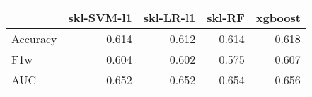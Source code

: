 \begin{tabular}{lrrrr}
\toprule
{} &  skl-SVM-l1 &  skl-LR-l1 &  skl-RF &  xgboost \\
\midrule
Accuracy &       0.614 &      0.612 &   0.614 &    0.618 \\
F1w      &       0.604 &      0.602 &   0.575 &    0.607 \\
AUC      &       0.652 &      0.652 &   0.654 &    0.656 \\
\bottomrule
\end{tabular}
